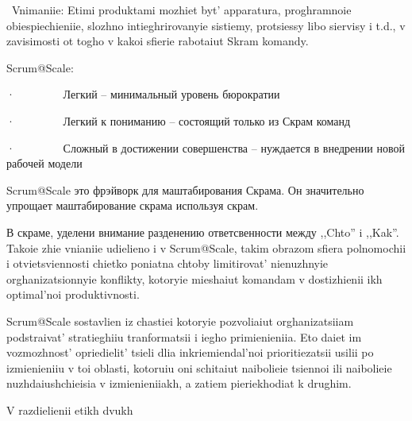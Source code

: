 \documentclass[10pt]{article}
\begin{document}
~Vnimaniie: Etimi produktami mozhiet byt' apparatura, proghramnoie
obiespiechieniie, slozhno intieghrirovanyie sistiemy, protsiessy libo siervisy i
t.d., v zavisimosti ot togho v kakoi sfierie rabotaiut Skram komandy.

Scrum@Scale:

·~~~~~~~~ Легкий -- минимальный уровень бюрократии {}

·~~~~~~~~ Легкий к пониманию -- состоящий только из Скрам команд

·~~~~~~~~ Сложный в достижении совершенства -- нуждается в внедрении
новой рабочей модели

Scrum@Scale это фрэйворк для маштабирования Скрама. Он значительно
упрощает маштабирование скрама используя скрам.

В скраме, уделени внимание разденению ответсвенности между ,,Chto'' i
,,Kak''. Takoie zhie vnianiie udielieno i v Scrum@Scale, takim obrazom sfiera
polnomochii i otvietsviennosti chietko poniatna chtoby limitirovat' nienuzhnyie
orghanizatsionnyie konflikty, kotoryie mieshaiut komandam v dostizhienii ikh
optimal'noi produktivnosti.

Scrum@Scale sostavlien iz chastiei kotoryie pozvoliaiut orghanizatsiiam
podstraivat' stratieghiiu tranformatsii i iegho primienieniia. Eto daiet im
vozmozhnost' opriedielit' tsieli dlia inkriemiendal'noi prioritiezatsii usilii po
izmienieniiu v toi oblasti, kotoruiu oni schitaiut naibolieie tsiennoi ili
naibolieie nuzhdaiushchieisia v izmienieniiakh, a zatiem pieriekhodiat k drughim.

V razdielienii etikh dvukh {}

~

~

~

\clearpage
\end{document}
